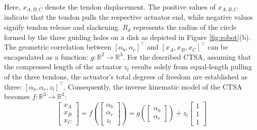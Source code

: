 Here, $x_{A,B,C}$ denote the tendon displacement. The positive values of $x_{A,B,C}$ indicate that the tendon pulls the respective actuator end, while negative values signify tendon release and slackening. $R_d$ represents the radius of the circle formed by the three guiding holes on a disk as depicted in Figure \ref{fig:robot}(b). The geometric correlation between $[\alpha_b, \alpha_r]^\top$ and $[x_A, x_B, x_C]^\top$ can be encapsulated as a function: $g: \mathbb{R}^2 \rightarrow \mathbb{R}^3$. For the described \ac{CTSA}, assuming that the compressed length of the actuator $z_l$ results solely from equal-length pulling of the three tendons, the actuator's total degrees of freedom are established as three: $[\alpha_b, \alpha_r, z_l]^\top$. Consequently, the inverse kinematic model of the \ac{CTSA} becomes $f : \mathbb{R}^3 \rightarrow \mathbb{R}^3$:
\begin{equation}
    \begin{bmatrix}x_A\\x_B\\x_C\end{bmatrix} = f(\begin{bmatrix}\alpha_b\\ \alpha_r\\ z_l\end{bmatrix}) = g(\begin{bmatrix}\alpha_b\\ \alpha_r\end{bmatrix}) + z_l\begin{bmatrix}1\\1\\1\end{bmatrix}
    \label{eq:cov2eq}
\end{equation}

